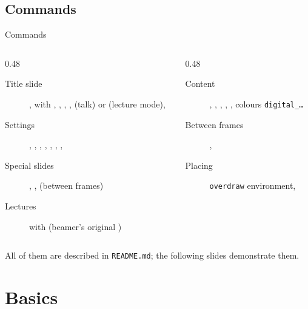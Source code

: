 \subsection{Commands}
\begin{frame}{Commands}
	\beamerdefaultoverlayspecification{}%
	\scriptsize
	\begin{columns}[T]
		\begin{column}{0.48\textwidth}
			\begin{description}
				\item[Title slide] ,  with , , , ,  (talk) or  (lecture mode), 
				\item[Settings] , , , , , , , 
				\item[Special slides] , ,  (between frames)
				\item[Lectures]  with  (beamer's original )
			\end{description}
		\end{column}
		\begin{column}{0.48\textwidth}
			\begin{description}
				\item[Content] , , , , , colours \texttt{digital\_\dots}
				\item[Between frames] , 
				\item[Placing] \texttt{overdraw} environment, 
			\end{description}
		\end{column}
	\end{columns}
	\medskip
	All of them are described in \texttt{README.md}; the following slides demonstrate them.
\end{frame}
%
%
\section{Basics}
